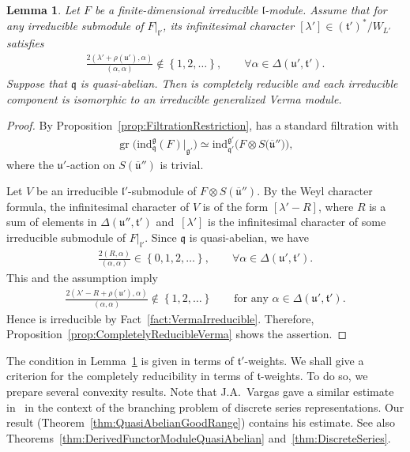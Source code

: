 \documentclass[11pt]{article}
\numberwithin{equation}{section}
\numberwithin{equation}{section}
\newtheorem{Lemma}[Theorem]{Lemma}
\theoremstyle{definition}
\newcommand{\set}[1]{\left\{#1 \right\}}
\DeclareMathOperator{\gr}{gr}
\newcommand{\lieC}[1]{\mathfrak{#1}}
\newcommand{\lie}[1]{\mathfrak{#1}}
\newcommand{\ind}[2]{\mathrm{ind}^{\lieC{#1}}_{\lieC{#2}}}
\begin{document}
\begin{Lemma}\label{lem:QuasiAbelianCompletelyReducible}
	Let $F$ be a finite-dimensional irreducible $\lie{l}$-module.
	Assume that for any irreducible submodule of $F|_{\lie{l}'}$, its infinitesimal character $[\lambda'] \in (\lie{t'})^*/W_{L'}$ satisfies
	\begin{align*}
		\frac{2(\lambda'+\rho(\lie{u}'), \alpha)}{(\alpha, \alpha)} \not \in \set{1, 2, \ldots}, \qquad \forall \alpha \in \Delta(\lie{u'}, \lie{t'}).
	\end{align*}
	Suppose that $\lie{q}$ is quasi-abelian.
	Then \smash{$\ind{g}{q}(F)|_{\lie{g}'}$} is completely reducible and each irreducible component is isomorphic to an irreducible generalized Verma module.
\end{Lemma}

\begin{proof}
	By Proposition~\ref{prop:FiltrationRestriction}, \smash{$\ind{g}{q}(F)|_{\lie{g}'}$} has a standard filtration with
	\begin{align*}
		\gr\bigl(\ind{g}{q}(F)|_{\lie{g}'}\bigr) \simeq \ind{g'}{q'}\bigl(F\otimes S\bigl(\lie{\overline{u}}''\bigr)\bigr),
	\end{align*}
	where the $\lie{u}'$-action on $S(\lie{\overline{u}}'')$ is trivial.

	Let $V$ be an irreducible $\lie{l'}$-submodule of $F\otimes S(\lie{\overline{u}}'')$.
	By the Weyl character formula, the infinitesimal character of $V$ is of the form $[\lambda' - R]$,
	where $R$ is a sum of elements in $\Delta(\lie{u''}, \lie{t'})$ and~$[\lambda']$ is the infinitesimal character of some irreducible submodule of $F|_{\lie{l'}}$.
	Since $\lie{q}$ is quasi-abelian, we have
	\begin{align*}
		\frac{2(R, \alpha)}{(\alpha, \alpha)} \in \set{0, 1, 2, \ldots}, \qquad \forall \alpha \in \Delta(\lie{u'}, \lie{t'}).
	\end{align*}
	This and the assumption imply
	\begin{align*}
		\frac{2(\lambda'-R+\rho(\lie{u}'), \alpha)}{(\alpha, \alpha)} \not \in \set{1, 2, \ldots}\qquad \text{for any }\alpha \in \Delta(\lie{u'}, \lie{t'}).
	\end{align*}
	Hence \smash{$\ind{g'}{q'}(V)$} is irreducible by Fact~\ref{fact:VermaIrreducible}.
	Therefore, Proposition~\ref{prop:CompletelyReducibleVerma} shows the assertion.
\end{proof}

The condition in Lemma~\ref{lem:QuasiAbelianCompletelyReducible} is given in terms of $\lie{t'}$-weights.
We shall give a criterion for the completely reducibility in terms of $\lie{t}$-weights.
To do so, we prepare several convexity results.
Note that J.A.~Vargas gave a similar estimate in~\cite[\S(1.5)]{Va16} in the context of the branching problem of discrete series representations.
Our result (Theorem~\ref{thm:QuasiAbelianGoodRange}) contains his estimate.
See also Theorems~\ref{thm:DerivedFunctorModuleQuasiAbelian} and~\ref{thm:DiscreteSeries}.
\end{document}

